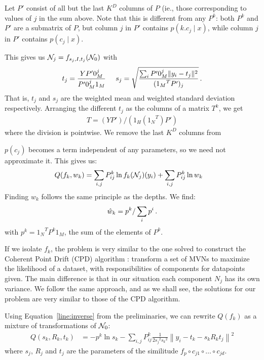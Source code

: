 \documentclass[10pt,a4paper,oneside]{article}
\theoremstyle{definition}
\newcommand{\p}{\mbox{\,.}}
\newcommand{\cN}{{\cal N}}
\theoremstyle{definition}
\begin{document}
Let $P'$ consist of all but the last $K^D$ columns of $P$ (ie., those corresponding to values of $j$ in the sum above. Note that this is different from any $P^k$: both $P^k$ and $P'$ are a submatrix of $P$, but column $j$ in $P'$ contains $p(k.c_j\mid x)$, while column $j$ in $P'$ contains $p(c_j \mid x)$. 

This gives us $\cN_j = f_{s_j, I, t_j}(\cN_0)$ with
\[
t_j = \frac{YP'0_M^j}{P'0_M^j 1_M} \;\;\;\;\; s_j = \sqrt{\frac{\sum_i P'0_M^j\| y_i - t_j\|^2 }{({1_M}^TP')_j}} \p
\]
That is, $t_j$ and $s_j$ are the weighted mean and weighted standard deviation respectively. Arranging the different $t_j$ as the columns of a matrix $T^k$, we get
\begin{align}
T = (YP') / (1_H({1_N}^T)P') \label{line:tk}
\end{align}
where the division is pointwise. We remove the last $K^D$ columns from 

$p(c_j)$ becomes a term independent of any parameters, so we need not approximate it. This gives us:
\begin{align*}
Q(f_k, w_k) &= \sum_{i, j} P^k_{ij} \ln f_k(\cN_j)(y_i) + \sum_{i, j} P^k_{ij} \ln w_k  
\end{align*}
Finding $w_k$ follows the same principle as the depths. We find:
\[
\hat w_k = p^k / \sum_{i} p^i \p
\]
with $p^k = {1_N}^TP^k1_M$, the sum of the elements of $P^k$.

If we isolate $f_k$, the problem is very similar to the one solved to construct the Coherent Point Drift (CPD) algorithm \cite{myronenko2010point}: transform a set of MVNs to maximize the likelihood of a dataset, with responsibilities of components for datapoints given. The main difference is that in our situation each component $N_j$ has its own variance. We follow the same approach, and as we shall see, the solutions for our problem are very similar to those of the CPD algorithm.

Using Equation~\ref{line:inverse} from the preliminaries, we can rewrite $Q(f_k)$ as a mixture of transformations of $\cN_0$:
\begin{align*} 
Q(s_k, R_k, t_k) &= - p^k\ln s_k - \sum_{i, j} P^k_{ij} \frac{1}{2{s_j}^2{s_k}^2} \left\|y_i-t_k - s_k R_k t_j \right\|^2 
\end{align*}
where $s_j$, $R_j$ and $t_j$ are the parameters of the similitude $f_p \circ c_{j1} \circ \ldots \circ c_{jd}$. 
\end{document}
